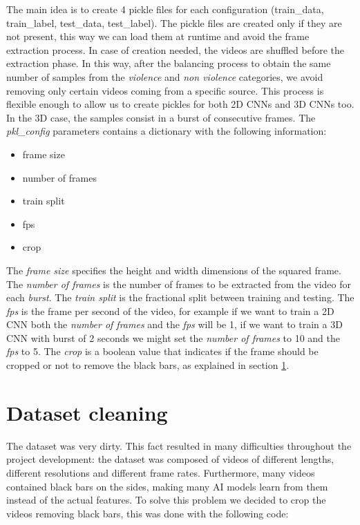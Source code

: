 The main idea is to create 4 pickle files for each configuration (train\_data, train\_label, test\_data, test\_label). The pickle files are created only if they are not present, this way we can load them at runtime and avoid the frame extraction process. In case of creation needed, the videos are shuffled before the extraction phase. In this way, after the balancing process to obtain the same number of samples from the \textit{violence} and \textit{non violence} categories, we avoid removing only certain videos coming from a specific source. This process is flexible enough to allow us to create pickles for both 2D CNNs and 3D CNNs too. In the 3D case, the samples consist in a burst of consecutive frames. The \textit{pkl\_config} parameters contains a dictionary with the following information:
\begin{itemize}
	\item frame size
	\item number of frames
	\item train split
	\item fps
	\item crop
\end{itemize}
The \textit{frame size} specifies the height and width dimensions of the squared frame. The \textit{number of frames} is the number of frames to be extracted from the video for each \textit{burst}. The \textit{train split} is the fractional split between training and testing. The \textit{fps} is the frame per second of the video, for example if we want to train a 2D CNN both the \textit{number of frames} and the \textit{fps} will be 1, if we want to train a 3D CNN with burst of 2 seconds we might set the \textit{number of frames} to 10 and the \textit{fps} to 5. The \textit{crop} is a boolean value that indicates if the frame should be cropped or not to remove the black bars, as explained in section \ref{sec:datasetcleaning}.

\section{Dataset cleaning}
\label{sec:datasetcleaning}
The dataset was very dirty. This fact resulted in many difficulties throughout the project development: the dataset was composed of videos of different lengths, different resolutions and different frame rates. Furthermore, many videos contained black bars on the sides, making many AI models learn from them instead of the actual features. To solve this problem we decided to crop the videos removing black bars, this was done with the following code:


